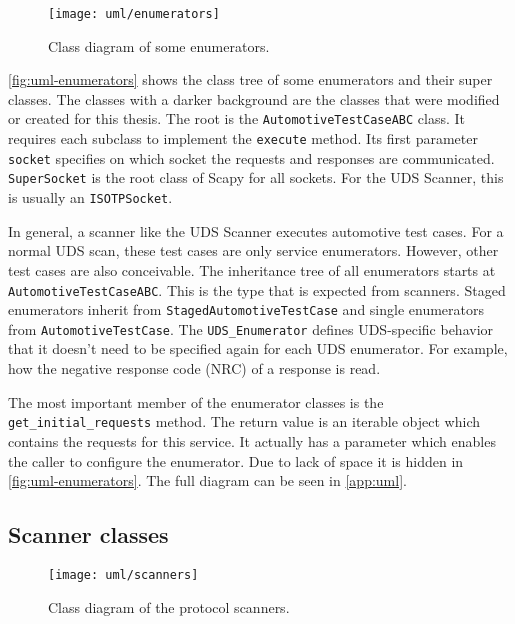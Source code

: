 \begin{figure}[htb]
    \centering
    \texttt{[image: uml/enumerators]}
    \caption{Class diagram of some enumerators.}
    \label{fig:uml-enumerators}
\end{figure}

\autoref{fig:uml-enumerators} shows the class tree of some enumerators and their super classes. The classes with a darker background are the classes that were modified or created for this thesis. The root is the \texttt{AutomotiveTestCaseABC} class. It requires each subclass to implement the \texttt{execute} method. Its first parameter \texttt{socket} specifies on which socket the requests and responses are communicated. \texttt{SuperSocket} is the root class of Scapy for all sockets. For the UDS Scanner, this is usually an \texttt{ISOTPSocket}.

In general, a scanner like the UDS Scanner executes automotive test cases. For a normal UDS scan, these test cases are only service enumerators. However, other test cases are also conceivable. The inheritance tree of all enumerators starts at \texttt{AutomotiveTestCaseABC}. This is the type that is expected from scanners.
Staged enumerators inherit from \texttt{StagedAutomotiveTestCase} and single enumerators from \texttt{AutomotiveTestCase}. The \texttt{UDS_Enumerator} defines UDS-specific behavior that it doesn't need to be specified again for each UDS enumerator. For example, how the negative response code (NRC) of a response is read.

The most important member of the enumerator classes is the \texttt{get_initial_requests} method. The return value is an iterable object which contains the requests for this service. It actually has a parameter which enables the caller to configure the enumerator. Due to lack of space it is hidden in \autoref{fig:uml-enumerators}. The full diagram can be seen in \autoref{app:uml}.


\subsection{Scanner classes}

\begin{figure}[htb]
    \centering
    \texttt{[image: uml/scanners]}
    \caption{Class diagram of the protocol scanners.}
    \label{fig:uml-scanners}
\end{figure}


